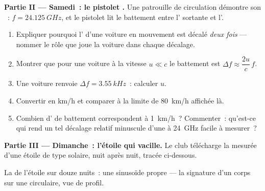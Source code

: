 \begin{problem}
\medskip
\noindent\textbf{Partie II --- Samedi~: le pistolet .}
Une patrouille de circulation démontre son ~:
$f = \qty{24.125}{GHz}$, et le pistolet lit le battement entre
l' sortante et l'.
\begin{enumerate}[resume]
  \item Expliquer pourquoi l' d'une voiture en mouvement est
        décalé \emph{deux fois} --- nommer le rôle que joue la voiture
        dans chaque décalage.
  \item Montrer que pour une voiture à la vitesse $u \ll c$ le battement
        est $\Delta f \approx \dfrac{2u}{c}\,f$.
  \item Une voiture renvoie $\Delta f = \qty{3.55}{kHz}$~: calculer $u$.
  \item Convertir en \unit{km/h} et comparer à la limite de
        \qty{80}{km/h} affichée là.
  \item Combien d' de battement correspondent à
        \qty{1}{km/h}~? Commenter~: qu'est-ce qui rend un tel décalage
        relatif minuscule d'une  à \qty{24}{GHz} facile à
        mesurer~?
\end{enumerate}

\medskip
\noindent\textbf{Partie III --- Dimanche~: l'étoile qui vacille.}
Le club télécharge la  mesurée d'une étoile
de type solaire, nuit après nuit, tracée ci-dessous.

\begin{omfigure}

{\small La  de l'étoile sur douze nuits~: une
sinusoïde propre --- la signature d'un corps sur une
 circulaire, vue de profil.}
\end{omfigure}


\end{problem}
